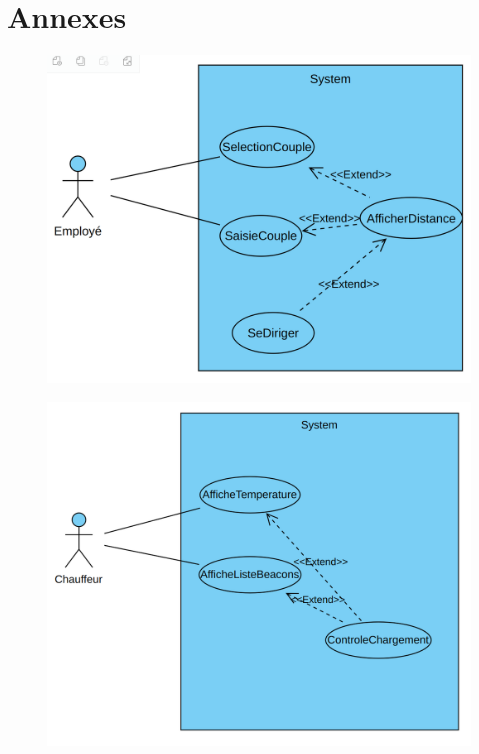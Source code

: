 \documentclass[10pt,a4paper]{article}
\begin{document}
\newpage

\section{Annexes}

\begin{figure}[h!]
    \includegraphics[scale=0.2]{../Diagrammes/recherche-actif.png}
    \caption{}
    \label{recherche-actif.png1}
\end{figure}

\begin{figure}[h!]
    \includegraphics[scale=0.2]{../Diagrammes/controle-chargement.png}
    \caption{}
    \label{controle-chargement.png1}
\end{figure}
\end{document}
